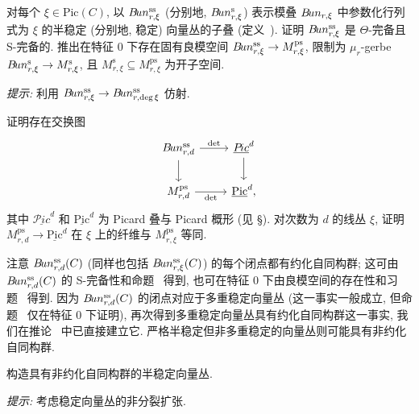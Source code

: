 \begin{exercise}\label{src:9.3.12}
对每个 $\xi\in\mathrm{Pic}(C)$, 以 $B\!un_{r,\xi}^{\mathrm{ss}}$ (分别地, $B\!un_{r,\xi}^{\mathrm s}$) 表示模叠 $B\!un_{r,\xi}$ 中参数化行列式为 $\xi$ 的半稳定 (分别地, 稳定) 向量丛的子叠 (定义~). 证明 $B\!un_{r,\xi}^{\mathrm{ss}}$ 是 $\Theta$-完备且 S-完备的. 推出在特征 $0$ 下存在固有良模空间 $B\!un_{r,\xi}^{\mathrm{ss}}\to M_{r,\xi}^{\mathrm{ps}}$, 限制为 $\mu_r$-gerbe $B\!un_{r,\xi}^{\mathrm s}\to M_{r,\xi}^{\mathrm s}$, 且 $M_{r,\xi}^{\mathrm s}\subseteq M_{r,\xi}^{\mathrm{ps}}$ 为开子空间.

\textit{提示:} 利用 $B\!un_{r,\xi}^{\mathrm{ss}}\to B\!un_{r,\deg\xi}^{\mathrm{ss}}$ 仿射.
\end{exercise}
\begin{exercise}\label{src:9.3.13}
证明存在交换图
\[
\begin{tikzcd}[ampersand replacement=\&]
\cBun_{r,d}^{\mathrm{ss}}\arrow[r,"\det"]\arrow[d]\&\underline{\mathcal P\!ic}^d\arrow[d]\\
M_{r,d}^{\mathrm{ps}}\arrow[r,"\det"']\&\underline{\mathrm{Pic}}^d,
\end{tikzcd}
\]
其中 $\underline{\mathcal P\!ic}^d$ 和 $\underline{\mathrm{Pic}}^d$ 为 Picard 叠与 Picard 概形 (见 \S{}). 对次数为 $d$ 的线丛 $\xi$, 证明 $M_{r,d}^{\mathrm{ps}}\to\underline{\mathrm{Pic}}^d$ 在 $\xi$ 上的纤维与 $M_{r,\xi}^{\mathrm{ps}}$ 等同.
\end{exercise}
注意 $B\!un_{r,d}^{\mathrm{ss}}(C)$ (同样也包括 $B\!un_{r,\xi}^{\mathrm{ss}}(C)$) 的每个闭点都有约化自同构群; 这可由 $B\!un_{r,d}^{\mathrm{ss}}(C)$ 的 S-完备性和命题~ 得到, 也可在特征 $0$ 下由良模空间的存在性和习题~ 得到. 因为 $B\!un_{r,d}^{\mathrm{ss}}(C)$ 的闭点对应于多重稳定向量丛 (这一事实一般成立, 但命题~ 仅在特征 $0$ 下证明), 再次得到多重稳定向量丛具有约化自同构群这一事实, 我们在推论~ 中已直接建立它. 严格半稳定但非多重稳定的向量丛则可能具有非约化自同构群.
\begin{exercise}\label{src:9.3.14}
构造具有非约化自同构群的半稳定向量丛.

\textit{提示:} 考虑稳定向量丛的非分裂扩张.
\end{exercise}
